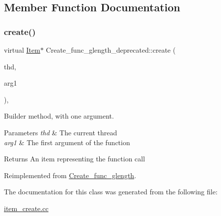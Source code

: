 \subsection{Member Function Documentation}
\mbox{\label{classCreate__func__glength__deprecated_a470bf648f489bdad5f2c621a0c046c9d}} 
\subsubsection{\texorpdfstring{create()}{create()}}
{\footnotesize\ttfamily virtual \mbox{\hyperlink{classItem}{Item}}$\ast$ Create\+\_\+func\+\_\+glength\+\_\+deprecated\+::create (\begin{DoxyParamCaption}\item[{T\+HD $\ast$}]{thd,  }\item[{\mbox{\hyperlink{classItem}{Item}} $\ast$}]{arg1 }\end{DoxyParamCaption})\hspace{0.3cm}{\ttfamily [inline]}, {\ttfamily [virtual]}}

Builder method, with one argument. 
\begin{DoxyParams}{Parameters}
{\em thd} & The current thread \\
\hline
{\em arg1} & The first argument of the function \\
\hline
\end{DoxyParams}
\begin{DoxyReturn}{Returns}
An item representing the function call 
\end{DoxyReturn}


Reimplemented from \mbox{\hyperlink{classCreate__func__glength_a419eeeb9fb55b66d9e21c4e7a9c7fc0d}{Create\+\_\+func\+\_\+glength}}.



The documentation for this class was generated from the following file\+:\begin{DoxyCompactItemize}
\item 
\mbox{\hyperlink{item__create_8cc}{item\+\_\+create.\+cc}}\end{DoxyCompactItemize}
